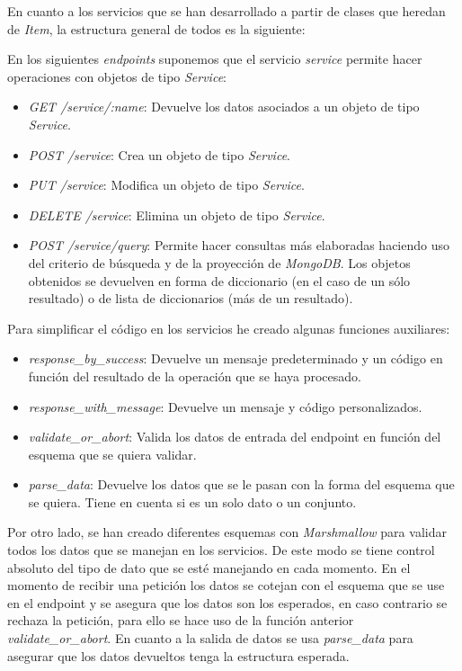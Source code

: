 En cuanto a los servicios que se han desarrollado a partir de clases que heredan de \textit{Item}, la estructura general de todos es la siguiente:

En los siguientes \textit{endpoints} suponemos que el servicio \textit{service} permite hacer operaciones con objetos de tipo \textit{Service}:
\begin{itemize}
	\item \textit{GET /service/:name}: Devuelve los datos asociados a un objeto de tipo \textit{Service}.
	\item \textit{POST /service}: Crea un objeto de tipo \textit{Service}.
	\item \textit{PUT /service}: Modifica un objeto de tipo \textit{Service}.
	\item \textit{DELETE /service}: Elimina un objeto de tipo \textit{Service}.
	\item \textit{POST /service/query}: Permite hacer consultas más elaboradas haciendo uso del criterio de búsqueda y de la proyección de \textit{MongoDB}. Los objetos obtenidos se devuelven en forma de diccionario (en el caso de un sólo resultado) o de lista de diccionarios (más de un resultado).
\end{itemize}


\bigskip
Para simplificar el código en los servicios he creado algunas funciones auxiliares:
\begin{itemize}
	\item \textit{response\_by\_success}: Devuelve un mensaje predeterminado y un código en función del resultado de la operación que se haya procesado.
	\item \textit{response\_with\_message}: Devuelve un mensaje y código personalizados.
	\item \textit{validate\_or\_abort}: Valida los datos de entrada del endpoint en función del esquema que se quiera validar.
	\item \textit{parse\_data}: Devuelve los datos que se le pasan con la forma del esquema que se quiera. Tiene en cuenta si es un solo dato o un conjunto.
\end{itemize}


\bigskip
Por otro lado, se han creado diferentes esquemas con \textit{Marshmallow} para validar todos los datos que se manejan en los servicios. De este modo se tiene control absoluto del tipo de dato que se esté manejando en cada momento. En el momento de recibir una petición los datos se cotejan con el esquema que se use en el endpoint y se asegura que los datos son los esperados, en caso contrario se rechaza la petición, para ello se hace uso de la función anterior \textit{validate\_or\_abort}. En cuanto a la salida de datos se usa \textit{parse\_data} para asegurar que los datos devueltos tenga la estructura esperada.


